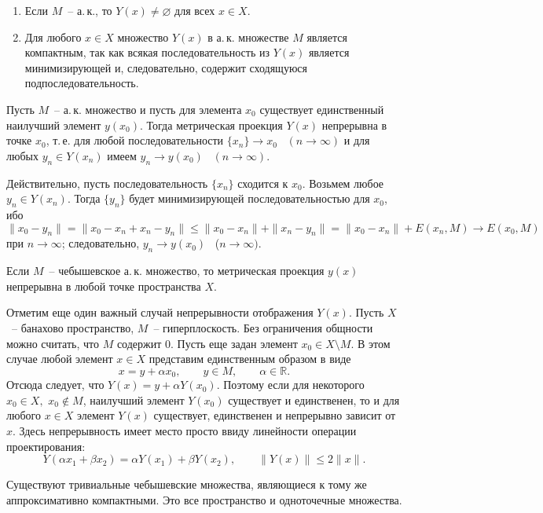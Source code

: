 \begin{enumerate}
\item Если $M$~-- а.\,к., то $Y(x)\ne \varnothing$ для всех $x\in X$.
\item Для любого $x\in X$ множество $Y(x)$ в а.\,к. множестве $M$ является
компактным, так как всякая последовательность из $Y(x)$ является
минимизирующей и, следовательно, содержит сходящуюся подпоследовательность.
\end{enumerate}

\begin{teo}[И.\,Зингер]
Пусть $M$~-- а.\,к. множество и пусть для элемента $x_0$ существует единственный
наилучший элемент $y(x_0)$. Тогда {метрическая проекция
$Y(x)$} непрерывна в точке $x_0$, т.\,е. для любой последовательности
$\{x_n\}\to x_0$~ $(n\to\infty)$ и для любых $y_n\in Y(x_n)$ имеем
$y_n\to y(x_0)$~ $(n\to\infty)$.
\end{teo}

Действительно, пусть последовательность $\{x_n\}$
сходится к $x_0$. Возьмем любое $y_n\in Y(x_n)$. Тогда $\{y_n\}$
будет минимизирующей последовательностью для $x_0$, ибо
$$
\|x_0-y_n\| = \|x_0-x_n+x_n-y_n\| \le \|x_0-x_n\| + \|x_n-y_n\| =
\|x_0-x_n\| + E(x_n,M) \to E(x_0,M)
$$
при $n\to\infty$; следовательно, $y_n\to y(x_0)$~ ($n\to\infty)$.

\begin{Corollary}
Если $M$~-- чебышевское а.\,к. множество, то метрическая проекция
$y(x)$ непрерывна в любой точке пространства $X$.
\end{Corollary}

\begin{Remark}
Отметим еще один важный случай непрерывности отображения $Y(x)$. Пусть
$X$~-- банахово пространство, $M$~-- гиперплоскость. Без
ограничения общности можно считать, что $M$ содержит $0$.
{Пусть еще задан элемент $x_0 \in X \setminus M$.}
В этом
случае любой элемент $x\in X$ представим единственным образом в виде
$$
x = y+\alpha x_0,\qquad y\in M,\qquad \alpha\in \mathbb R.
$$
{Отсюда следует, что $Y(x)=y+\alpha Y(x_0)$. Поэтому если} для некоторого
{$x_0\in X,$} {$x_0\notin M$}, наилучший элемент
{$Y(x_0)$} существует и единственен, то и для любого {$x\in X$} элемент $Y(x)$
существует, единственен и непрерывно зависит от $x$. Здесь
непрерывность имеет место просто ввиду линейности операции проектирования:
$$
Y(\alpha x_1+\beta x_2)=\alpha Y(x_1)+\beta Y(x_2),\qquad \|Y(x)\| \le 2\|x\|.
$$
\end{Remark}

Существуют тривиальные чебышевские множества, являющиеся к тому же
аппроксимативно компактными. Это все пространство и одноточечные множества.

